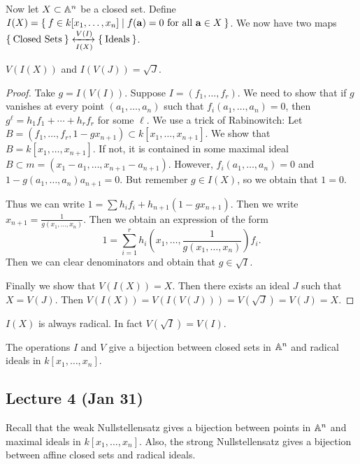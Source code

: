 \documentclass[twoside, 10pt]{article}
\begin{document}
    Now let $X \subset \mathbb{A}^n$ be a closed set. Define $I(X) = \Set{f \in k[x_1, \ldots, x_n] | f(\mathbf{a}) = 0 \text{ for all $\mathbf{a} \in X$}}$. We now have two maps $\Set{\text{Closed Sets}} \xleftrightarrow[I(X)]{V(I)} \Set{\text{Ideals}}$.

    \begin{thm}
        $V(I(X))$ and $I(V(J)) = \sqrt{J}$.
        \begin{proof}
            Take $g = I(V(I))$. Suppose $I = (f_1, \ldots, f_r)$. We need to show that if $g$ vanishes at every point $(a_1, \ldots, a_n)$ such that $f_i(a_1, \ldots, a_n) = 0$, then $g^{\ell} = h_1f_1 + \cdots + h_rf_r$ for some $\ell$. We use a trick of Rabinowitch: Let $B = (f_1, \ldots, f_r, 1 - gx_{n+1}) \subset k[x_1, \ldots, x_{n+1}]$. We show that $B = k[x_1, \ldots, x_{n+1}]$. If not, it is contained in some maximal ideal $B \subset m = (x_1-a_1, \ldots, x_{n+1}-a_{n+1})$. However, $f_i(a_1, \ldots, a_n) = 0$ and $1-g(a_1, \ldots, a_n)a_{n+1} = 0$. But remember $g \in I(X)$, so we obtain that $1=0$.

            Thus we can write $1 = \sum h_if_i + h_{n+1}(1-gx_{n+1})$. Then we write $x_{n+1} = \frac{1}{g(x_1, \ldots, x_n)}$. Then we obtain an expression of the form \[1 = \sum_{i=1}^r h_i(x_1, \ldots, \frac{1}{g(x_1, \ldots, x_n)})f_i.\] Then we can clear denominators and obtain that $g \in \sqrt{I}$.

            Finally we show that $V(I(X)) = X$. Then there exists an ideal $J$ such that $X=V(J)$. Then $V(I(X)) = V(I(V(J))) = V(\sqrt{J}) = V(J) = X$.
        \end{proof}
    \end{thm}

    \begin{rmk}
        $I(X)$ is always radical. In fact $V(\sqrt{I}) = V(I)$.
    \end{rmk}

    \begin{cor}
        The operations $I$ and $V$ give a bijection between closed sets in $\mathbb{A}^n$ and radical ideals in $k[x_1, \ldots, x_n]$. 
    \end{cor}

    \subsection{Lecture 4 (Jan 31)}

    Recall that the weak Nullstellensatz gives a bijection between points in $\mathbb{A}^n$ and maximal ideals in $k[x_1, \ldots, x_n]$. Also, the strong Nullstellensatz gives a bijection between affine closed sets and radical ideals. 
\end{document}
